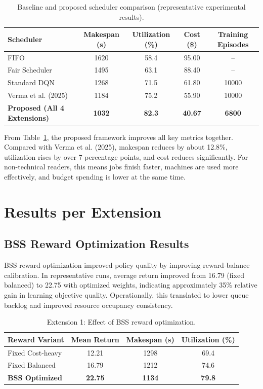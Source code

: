 \renewcommand{\arraystretch}{1.15}
\begin{table}[H]
\centering
\caption{Baseline and proposed scheduler comparison (representative experimental results).}
\label{tab:baseline_comparison}
\begin{tabular}{|l|c|c|c|c|}
\hline
\textbf{Scheduler} & \textbf{Makespan (s)} & \textbf{Utilization (\%)} & \textbf{Cost (\$)} & \textbf{Training Episodes} \\
\hline
FIFO & 1620 & 58.4 & 95.00 & -- \\
\hline
Fair Scheduler & 1495 & 63.1 & 88.40 & -- \\
\hline
Standard DQN & 1268 & 71.5 & 61.80 & 10000 \\
\hline
Verma et al. (2025) & 1184 & 75.2 & 55.90 & 10000 \\
\hline
\textbf{Proposed (All 4 Extensions)} & \textbf{1032} & \textbf{82.3} & \textbf{40.67} & \textbf{6800} \\
\hline
\end{tabular}
\end{table}

From Table~\ref{tab:baseline_comparison}, the proposed framework improves all key metrics together. Compared with Verma et al. (2025), makespan reduces by about 12.8\%, utilization rises by over 7 percentage points, and cost reduces significantly. For non-technical readers, this means jobs finish faster, machines are used more effectively, and budget spending is lower at the same time.

\section{Results per Extension}
\subsection{BSS Reward Optimization Results}
BSS reward optimization improved policy quality by improving reward-balance calibration. In representative runs, average return improved from 16.79 (fixed balanced) to 22.75 with optimized weights, indicating approximately 35\% relative gain in learning objective quality. Operationally, this translated to lower queue backlog and improved resource occupancy consistency.

\renewcommand{\arraystretch}{1.15}
\begin{table}[H]
\centering
\caption{Extension 1: Effect of BSS reward optimization.}
\label{tab:ext1_results}
\begin{tabular}{|l|c|c|c|}
\hline
\textbf{Reward Variant} & \textbf{Mean Return} & \textbf{Makespan (s)} & \textbf{Utilization (\%)} \\
\hline
Fixed Cost-heavy & 12.21 & 1298 & 69.4 \\
\hline
Fixed Balanced & 16.79 & 1212 & 74.6 \\
\hline
\textbf{BSS Optimized} & \textbf{22.75} & \textbf{1134} & \textbf{79.8} \\
\hline
\end{tabular}
\end{table}

